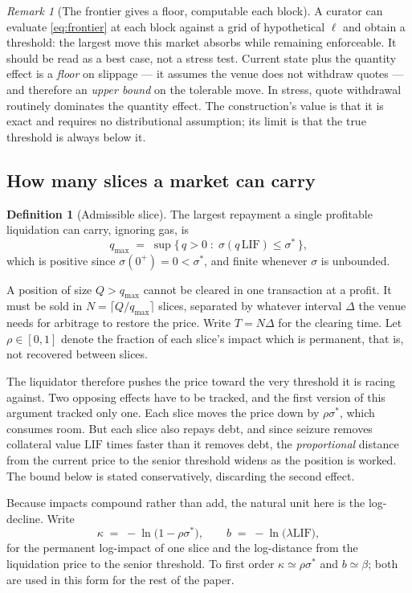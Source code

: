 \documentclass[11pt,a4paper]{article}
\theoremstyle{plain}
\theoremstyle{definition}
\newtheorem{definition}[proposition]{Definition}
\theoremstyle{remark}
\newtheorem{remark}[proposition]{Remark}
\newcommand{\LIF}{\mathrm{LIF}}
\begin{document}
\begin{remark}[The frontier gives a floor, computable each block]
A curator can evaluate \eqref{eq:frontier} at each block against a grid of hypothetical $\ell$
and obtain a threshold: the largest move this market absorbs while remaining enforceable. It
should be read as a best case, not a stress test. Current state plus the quantity effect is a
\emph{floor} on slippage --- it assumes the venue does not withdraw quotes --- and therefore an
\emph{upper bound} on the tolerable move. In stress, quote withdrawal routinely dominates the
quantity effect. The construction's value is that it is exact and requires no distributional
assumption; its limit is that the true threshold is always below it.
\end{remark}

\subsection{How many slices a market can carry}

\begin{definition}[Admissible slice]
The largest repayment a single profitable liquidation can carry, ignoring gas, is
\[
  q_{\max} \;=\; \sup\{\,q>0 \;:\; \sigma(q\,\LIF)\leq\sigma^{*}\,\},
\]
which is positive since $\sigma(0^{+})=0<\sigma^{*}$, and finite whenever $\sigma$ is unbounded.
\end{definition}

A position of size $Q>q_{\max}$ cannot be cleared in one transaction at a profit. It must be sold
in $N=\lceil Q/q_{\max}\rceil$ slices, separated by whatever interval $\Delta$ the venue needs for
arbitrage to restore the price. Write $T=N\Delta$ for the clearing time. Let $\rho\in[0,1]$ denote
the fraction of each slice's impact which is permanent, that is, not recovered between slices.

The liquidator therefore pushes the price toward the very threshold it is racing against. Two
opposing effects have to be tracked, and the first version of this argument tracked only one. Each
slice moves the price down by $\rho\sigma^{*}$, which consumes room. But each slice also repays
debt, and since seizure removes collateral value $\LIF$ times faster than it removes debt, the
\emph{proportional} distance from the current price to the senior threshold widens as the position
is worked. The bound below is stated conservatively, discarding the second effect.

Because impacts compound rather than add, the natural unit here is the log-decline. Write
\begin{equation}\label{eq:logunits}
  \kappa \;=\; -\ln\bigl(1-\rho\sigma^{*}\bigr), \qquad b \;=\; -\ln\bigl(\lambda\LIF\bigr),
\end{equation}
for the permanent log-impact of one slice and the log-distance from the liquidation price to the
senior threshold. To first order $\kappa \simeq \rho\sigma^{*}$ and $b \simeq \beta$; both are used
in this form for the rest of the paper.
\end{document}
